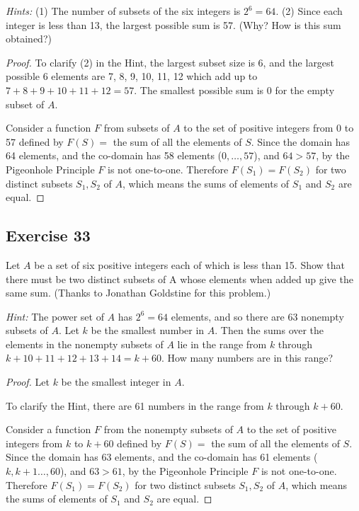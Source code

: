 \documentclass[14pt]{extarticle}
\begin{document}
{\it Hints:} (1) The number of subsets of the six integers
is \(2^6 = 64\). (2) Since each integer is less than 13, 
the largest possible sum is 57. (Why? How is this sum obtained?)

\begin{proof}
To clarify (2) in the Hint, the largest subset size is 6, and the largest possible 6 elements are 7, 8, 9, 10, 11, 12
which add up to \(7+8+9+10+11+12 = 57\). The smallest possible sum is 0 for the empty subset of \(A\).

Consider a function \(F\) from subsets of \(A\) to the set of positive integers from 0 to 57 defined by \(F(S) = \) 
the sum of all the elements of \(S\). Since the domain has 64 elements, and the co-domain has 58 elements (\(0,\ldots, 
57\)), and  \(64 > 57\), by the Pigeonhole Principle \(F\) is not one-to-one. Therefore \(F(S_1) = F(S_2)\) for two 
distinct subsets \(S_1, S_2\) of \(A\), which means the sums of elements of \(S_1\) and \(S_2\) are equal.
\end{proof}

\subsection{Exercise 33}
Let \(A\) be a set of six positive integers each of which is less than 15. Show that there must be two distinct 
subsets of A whose elements when added up give the same sum. (Thanks to Jonathan Goldstine for this problem.)

{\it Hint:} The power set of \(A\) has \(2^6 = 64\) elements, and so there are 63 nonempty subsets of \(A\). 
Let \(k\) be the smallest number in \(A\). Then the sums over the elements in the nonempty subsets of \(A\) lie in 
the range from \(k\) through \(k + 10 + 11 + 12 + 13 + 14 = k + 60\). How many numbers are in this range?

\begin{proof}
Let \(k\) be the smallest integer in \(A\).

To clarify the Hint, there are 61 numbers in the range from \(k\) through \(k+60\). 

Consider a function \(F\) from the nonempty subsets of \(A\) to the set of positive integers from \(k\) to \(k+60\) 
defined by \(F(S) = \) the sum of all the elements of \(S\). Since the domain has 63 elements, and the co-domain 
has 61 elements (\(k, k+1 \ldots, 60\)), and \(63 > 61\), by the Pigeonhole Principle \(F\) is not one-to-one. 
Therefore \(F(S_1) = F(S_2)\) for two distinct subsets \(S_1, S_2\) of \(A\), which means the sums of elements of 
\(S_1\) and \(S_2\) are equal.
\end{proof}
\end{document}
